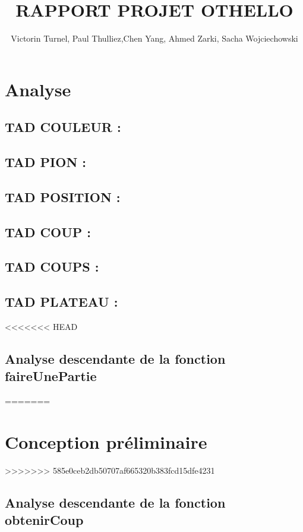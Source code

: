 \documentclass{article}
\title{RAPPORT PROJET OTHELLO}
\author{Victorin Turnel, Paul Thulliez,Chen Yang, Ahmed Zarki, Sacha Wojciechowski}
\begin{document}
\maketitle

\section{Analyse}

\subsection{TAD COULEUR :}


\subsection{TAD PION :}


\subsection{TAD POSITION :}


\subsection{TAD COUP :}


\subsection{TAD COUPS :}


\subsection{TAD PLATEAU :}


<<<<<<< HEAD
\subsection{Analyse descendante de la fonction faireUnePartie}
=======
\section{Conception préliminaire}
>>>>>>> 585e0ceb2db50707af665320b383fcd15dfe4231

\subsection{Analyse descendante de la fonction obtenirCoup}
\end{document}
